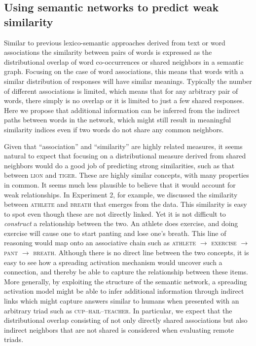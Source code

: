 \documentclass[doc]{apa6}
\newcommand{\stimulus}[1]{\textsc{#1}}
\begin{document}
\subsection{Using semantic networks to predict weak similarity}
Similar to previous lexico-semantic approaches derived from text \parencite{Recchia2009} or word associations \parencite{Deese1965,BorgeHolthoeferArenas2010,Steyvers2004,DeDeyne2009} the similarity between pairs of words is expressed as the distributional overlap of word co-occurrences or shared neighbors in a semantic graph.
Focusing on the case of word associations, this means that words with a similar distribution of responses will have similar meanings. Typically the number of different associations is limited, which means that for any arbitrary pair of words, there simply is no overlap or it is limited to just a few shared responses.
Here we propose that additional information can be inferred from the indirect paths between words in the network, which might still result in meaningful similarity indices even if two words do not share any common neighbors.


Given that ``association'' and ``similarity'' are highly related measures, it seems natural to expect that focusing on a distributional measure derived from shared neighbors would do a good job of predicting strong similarities, such as that between \stimulus{lion} and \stimulus{tiger}. These are highly similar concepts,  with many properties in common. It seems much less plausible to believe that it would account for weak relationships. In Experiment 2, for example, we discussed the similarity between \stimulus{athlete} and \stimulus{breath} that emerges from the data. This similarity is easy to spot even though these are not directly linked. Yet it is not difficult to {\it construct} a relationship between the two. An athlete does exercise, and doing exercise will cause one to start panting and lose one's breath. This line of reasoning would map onto an associative chain such as \stimulus{athlete} $\rightarrow$ \stimulus{exercise} $\rightarrow$ \stimulus{pant} $\rightarrow$ \stimulus{breath}. Although there is no  direct line between the two concepts, it is easy to see how a spreading activation mechanism \parencite[e.g.,][]{Collins1969} would uncover such a connection, and thereby be able to capture the relationship between these items. More generally, by exploiting the structure of the semantic network, a spreading activation model might be able to infer additional information through indirect links which might capture answers similar to humans when presented with an arbitrary triad such as \stimulus{cup}--\stimulus{hail}--\stimulus{teacher}. In particular, we expect that the distributional overlap consisting of not only directly shared associations but also indirect neighbors that are not shared is considered when evaluating remote triads.
\end{document}
